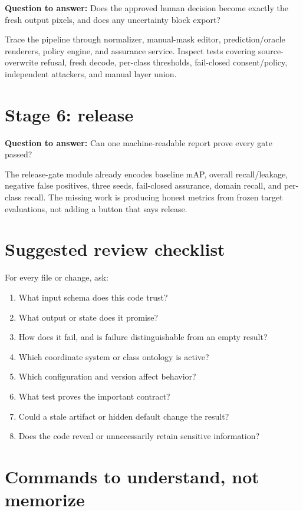 \textbf{Question to answer:} Does the approved human decision become exactly the fresh output pixels, and does any uncertainty block export?

Trace the pipeline through normalizer, manual-mask editor, prediction/oracle renderers, policy engine, and assurance service. Inspect tests covering source-overwrite refusal, fresh decode, per-class thresholds, fail-closed consent/policy, independent attackers, and manual layer union.

\section{Stage 6: release}

\textbf{Question to answer:} Can one machine-readable report prove every gate passed?

The release-gate module already encodes baseline mAP, overall recall/leakage, negative false positives, three seeds, fail-closed assurance, domain recall, and per-class recall. The missing work is producing honest metrics from frozen target evaluations, not adding a button that says release.

\section{Suggested review checklist}

For every file or change, ask:

\begin{enumerate}[leftmargin=7mm]
  \item What input schema does this code trust?
  \item What output or state does it promise?
  \item How does it fail, and is failure distinguishable from an empty result?
  \item Which coordinate system or class ontology is active?
  \item Which configuration and version affect behavior?
  \item What test proves the important contract?
  \item Could a stale artifact or hidden default change the result?
  \item Does the code reveal or unnecessarily retain sensitive information?
\end{enumerate}

\section{Commands to understand, not memorize}

